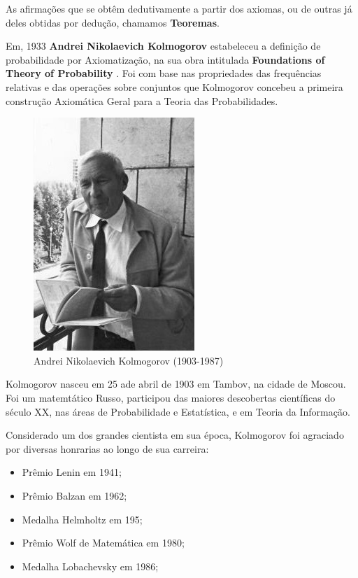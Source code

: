  \inic As afirmações que se obtêm dedutivamente a partir dos axiomas, ou de outras já deles obtidas por dedução, chamamos \textbf{Teoremas}.\vskip0.3cm

 \newpage
 \inic Em, 1933 \textbf{Andrei Nikolaevich Kolmogorov} estabeleceu a definição de probabilidade por Axiomatização, na sua obra intitulada \textbf{Foundations of Theory of Probability} . Foi com base nas propriedades das frequências relativas e das operações sobre conjuntos que Kolmogorov concebeu a primeira construção Axiomática Geral para a Teoria das Probabilidades.


\begin{figure}
    \centering
    \includegraphics[scale=0.6]{figures/Kolmogorov.jpeg}
    \caption{Andrei Nikolaevich Kolmogorov (1903-1987)}
    \label{fig:my_label10}
\end{figure}

Kolmogorov nasceu em 25 ade abril de 1903 em Tambov, na cidade de Moscou. Foi um matemtático Russo, participou das maiores descobertas científicas do século XX, nas áreas de Probabilidade e Estatística, e em Teoria da Informação.\vskip0.3cm

Considerado um dos grandes cientista em sua época, Kolmogorov foi agraciado por diversas honrarias ao longo de sua carreira:

\begin{itemize}
\item Prêmio Lenin em 1941;
\item Prêmio Balzan em 1962;
\item Medalha Helmholtz em 195;
\item Prêmio Wolf de Matemática em 1980;
\item Medalha Lobachevsky em 1986;
\end{itemize}










